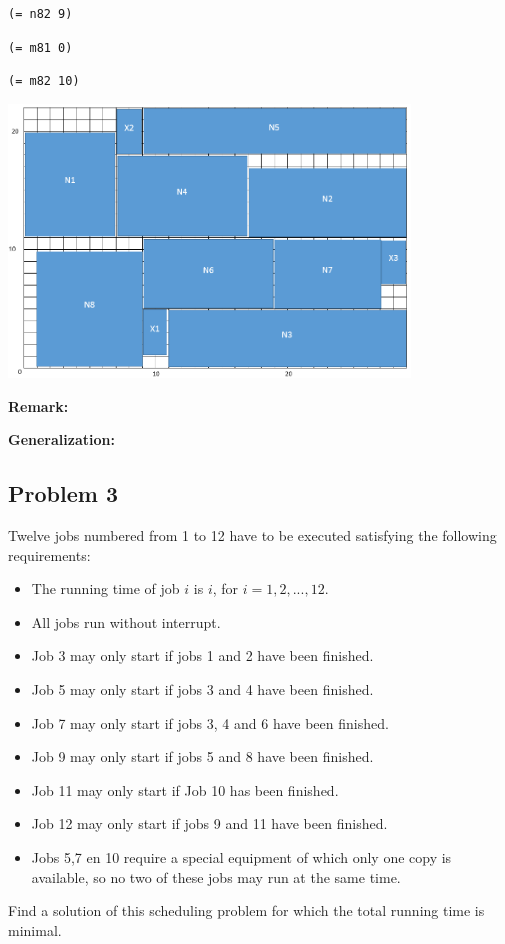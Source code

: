 \documentclass[11pt]{article}
\begin{document}
{{{\tt(= n82 9)}

{\tt(= m81 0)}

{\tt(= m82 10)}

}

\begin{center}
\includegraphics[width=0.8\textwidth]{Part1_2_3.png}
\end{center}

\vspace{3mm}

{\bf Remark:}

\vspace{3mm}

{\bf Generalization:}

\vspace{5mm}

\subsection*{Problem 3}

Twelve jobs numbered from 1 to 12 have to be executed satisfying the following requirements:
\begin{itemize}
  \item The running time of job $i$ is $i$, for $i = 1, 2, . . . , 12$.
  \item All jobs run without interrupt.
  \item Job 3 may only start if jobs 1 and 2 have been finished.
  \item Job 5 may only start if jobs 3 and 4 have been finished.
  \item Job 7 may only start if jobs 3, 4 and 6 have been finished.
  \item Job 9 may only start if jobs 5 and 8 have been finished.
  \item Job 11 may only start if Job 10 has been finished.
  \item Job 12 may only start if jobs 9 and 11 have been finished.
  \item Jobs 5,7 en 10 require a special equipment of which only one copy is available, so no two of these jobs may run at the same time.
\end{itemize}
Find a solution of this scheduling problem for which the total running time is minimal.

}
\end{document}
